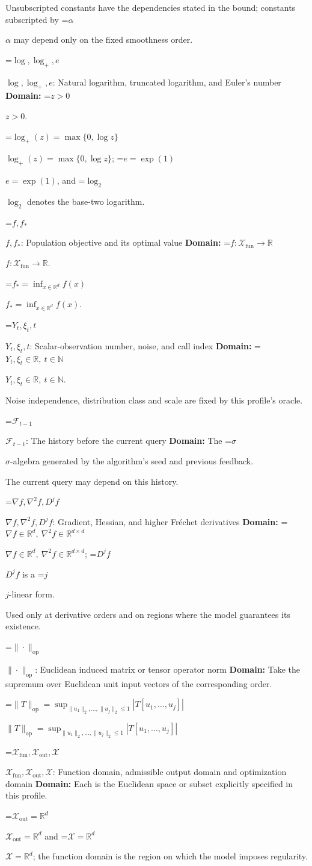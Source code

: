 \documentclass[10pt,a4paper]{article}
\newcommand{\AtlasMath}[1]{\par\begingroup\centering\setbox0=\hbox{$\displaystyle #1$}\ifdim\wd0>1.4\linewidth\typeout{ATLAS WIDE FORMULA: \the\wd0}\fi\ifdim\wd0>\linewidth\resizebox{\linewidth}{!}{\box0}\else\box0\fi\par\endgroup}
\newcommand{\AtlasInlineMath}[1]{\begingroup\setbox0=\hbox{$#1$}\ifdim\wd0>.4\linewidth\endgroup\AtlasMath{#1}\else\endgroup$#1$\fi}
\begin{document}
Unsubscripted constants have the dependencies stated in the bound; constants subscripted by \AtlasInlineMath{\alpha} may depend only on the fixed smoothness order.

\AtlasInlineMath{\log,\log_+,e}: Natural logarithm, truncated logarithm, and Euler's number \textbf{Domain:} \AtlasInlineMath{z>0}.

\AtlasInlineMath{\log_+(z)=\max\{0,\log z\}}; \AtlasInlineMath{e=\exp(1)}, and \AtlasInlineMath{\log_2} denotes the base-two logarithm.

\AtlasInlineMath{f,f_*}: Population objective and its optimal value \textbf{Domain:} \AtlasInlineMath{f:\mathcal{X}_{\mathrm{fun}}\to\mathbb{R}}.

\AtlasInlineMath{f_*=\inf_{x\in \mathbb{R}^d}f(x)}.

\AtlasInlineMath{Y_t,\xi_t,t}: Scalar-observation number, noise, and call index \textbf{Domain:} \AtlasInlineMath{Y_t,\xi_t\in\mathbb{R},\ t\in\mathbb{N}}.

Noise independence, distribution class and scale are fixed by this profile's oracle.

\AtlasInlineMath{\mathcal{F}_{t-1}}: The history before the current query \textbf{Domain:} The \AtlasInlineMath{\sigma}-algebra generated by the algorithm's seed and previous feedback.

The current query may depend on this history.

\AtlasInlineMath{\nabla f,\nabla^2f,D^jf}: Gradient, Hessian, and higher Fréchet derivatives \textbf{Domain:} \AtlasInlineMath{\nabla f\in\mathbb{R}^d,\ \nabla^2f\in\mathbb{R}^{d\times d}}; \AtlasInlineMath{D^jf} is a \AtlasInlineMath{j}-linear form.

Used only at derivative orders and on regions where the model guarantees its existence.

\AtlasInlineMath{\|\cdot\|_{\mathrm{op}}}: Euclidean induced matrix or tensor operator norm \textbf{Domain:} Take the supremum over Euclidean unit input vectors of the corresponding order.

\AtlasInlineMath{\|T\|_{\mathrm{op}}=\sup_{\|u_1\|_2,\ldots,\|u_j\|_2\le1}|T[u_1,\ldots,u_j]|}

\AtlasInlineMath{\mathcal{X}_{\mathrm{fun}},\mathcal{X}_{\mathrm{out}},\mathcal{X}}: Function domain, admissible output domain and optimization domain \textbf{Domain:} Each is the Euclidean space or subset explicitly specified in this profile.

\AtlasInlineMath{\mathcal{X}_{\mathrm{out}}=\mathbb{R}^d} and \AtlasInlineMath{\mathcal{X}=\mathbb{R}^d}; the function domain is the region on which the model imposes regularity.
\end{document}
